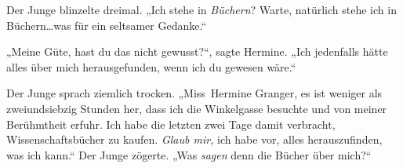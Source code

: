 Der Junge blinzelte dreimal. „Ich stehe in \emph{Büchern}? Warte, natürlich stehe ich in Büchern…was für ein seltsamer Gedanke.“

„Meine Güte, hast du das nicht gewusst?“, sagte Hermine. „Ich jedenfalls hätte alles über mich herausgefunden, wenn ich du gewesen wäre.“

Der Junge sprach ziemlich trocken. „Miss~Hermine Granger, es ist weniger als zweiundsiebzig Stunden her, dass ich die Winkelgasse besuchte und von meiner Berühmtheit erfuhr. Ich habe die letzten zwei Tage damit verbracht, Wissenschaftsbücher zu kaufen. \emph{Glaub mir,} ich habe vor, alles herauszufinden, was ich kann.“ Der Junge zögerte. „Was \emph{sagen} denn die Bücher über mich?“

